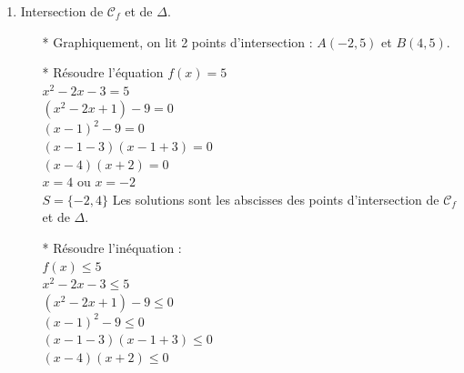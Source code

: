 \begin{enumerate}
\item Intersection de $\mathcal{C}_f$ et de $\Delta$.

\begin{itemize}
\item [*] Graphiquement, on lit 2 points d'intersection : $A(-2, 5)$ et $B(4, 5)$.

\item [*] Résoudre l'équation $f(x) = 5$\\

$ x^2 -2x -3 = 5$\\
$(x^2 -2x +1) -9 = 0 $\\
$(x - 1)^2 -9 = 0 $ \\
$(x -1 -3) (x -1 +3) = 0 $\\
$(x - 4) (x + 2) = 0 $\\

$x = 4$ ou $ x = -2$ \\

$S=\{-2, 4\}$ Les solutions sont les abscisses 
               des points d'intersection de $\mathcal{C}_f$ et de $\Delta$.\\
               
               
               
\item [*] Résoudre l'inéquation : \\

$f(x) \leqslant 5$\\
$ x^2 -2x -3 \leqslant 5$\\
$(x^2 -2x +1) -9 \leqslant 0 $\\
$(x - 1)^2 -9 \leqslant 0 $ \\
$(x -1 -3) (x -1 +3) \leqslant 0 $\\
$(x - 4) (x + 2) \leqslant 0 $\\           

 \\


\end{itemize}
\end{enumerate}
